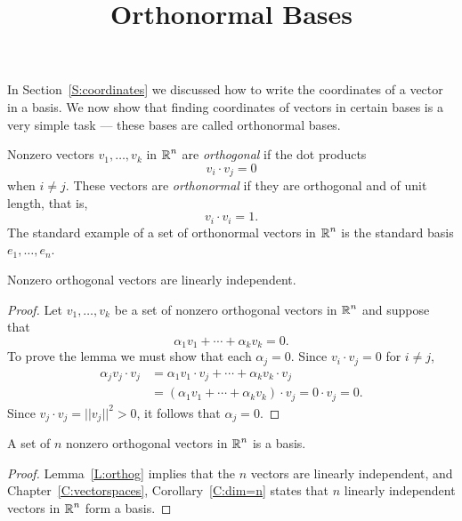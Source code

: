 \documentclass{ximera}
\title{Orthonormal Bases}
\begin{document}
\begin{abstract}
\end{abstract}
\maketitle


\label{S:orthonormal}

In Section~\ref{S:coordinates} we discussed how to write the coordinates of
a vector in a basis.  We now show that finding coordinates of vectors in
certain bases is a very simple task --- these bases are called orthonormal
bases.

Nonzero vectors $v_1,\ldots,v_k$ in $\mbox{$\Bbb{R}$}^n$ are
{\em orthogonal\/} if the
dot products
\[
v_i\cdot v_j  =  0
\]
when $i\neq j$.  These vectors are
{\em orthonormal\/} if they are
orthogonal and of unit length, that is,
\[
v_i\cdot v_i=1.
\]
The standard example of a set of orthonormal vectors in $\mbox{$\Bbb{R}$}^n$ is the
standard basis $e_1,\ldots,e_n$.

\begin{lemma} \label{L:orthog}
Nonzero orthogonal vectors are
linearly independent.
\end{lemma}

\begin{proof}  Let $v_1,\ldots,v_k$ be a set of nonzero orthogonal vectors in $\mbox{$\Bbb{R}$}^n$
and suppose that
\[
\alpha_1v_1 + \cdots + \alpha_kv_k = 0.
\]
To prove the lemma we must show that each $\alpha_j=0$.  Since
$v_i\cdot v_j = 0$ for $i\not= j$,
\begin{align*}
  \alpha_jv_j\cdot v_j &= \alpha_1v_1\cdot v_j + \cdots + \alpha_kv_k\cdot v_j \\
  &= (\alpha_1v_1 + \cdots +\alpha_kv_k)\cdot v_j = 0\cdot v_j = 0.
\end{align*}
Since $v_j\cdot v_j = ||v_j||^2> 0$, it follows that $\alpha_j=0$.  \end{proof}

\begin{corollary}
A set of $n$ nonzero orthogonal vectors in $\mbox{$\Bbb{R}$}^n$ is a basis.
\end{corollary}

\begin{proof}  Lemma~\ref{L:orthog} implies that the $n$ vectors are linearly
independent, and Chapter~\ref{C:vectorspaces}, Corollary~\ref{C:dim=n} states
that $n$ linearly independent vectors in $\mbox{$\Bbb{R}$}^n$ form a basis.  \end{proof}
\end{document}
